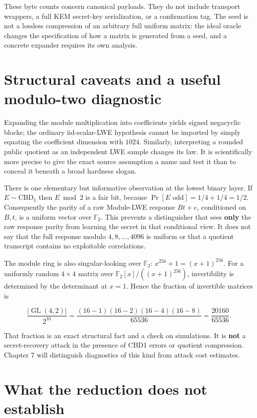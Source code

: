 \documentclass[
  11pt,
  a4paper,
  oneside]{report}
\begin{document}
These byte counts concern canonical payloads. They do not include
transport wrappers, a full KEM secret-key serialization, or a
confirmation tag. The seed is not a lossless compression of an arbitrary
full uniform matrix: the ideal oracle changes the specification of how a
matrix is generated from a seed, and a concrete expander requires its
own analysis.

\section{Structural caveats and a useful modulo-two
diagnostic}\label{structural-caveats-and-a-useful-modulo-two-diagnostic}

Expanding the module multiplication into coefficients yields signed
negacyclic blocks; the ordinary iid-scalar-LWE hypothesis cannot be
imported by simply equating the coefficient dimension with \(1024\).
Similarly, interpreting a rounded public quotient as an independent LWE
sample changes its law. It is scientifically more precise to give the
exact source assumption a name and test it than to conceal it beneath a
broad hardness slogan.

There is one elementary but informative observation at the lowest binary
layer. If \(E\sim\mathrm{CBD}_1\) then \(E\bmod2\) is a fair bit,
because \(\Pr[E\text{ odd}]=1/4+1/4=1/2\). Consequently the parity of a
raw Module-LWE response \(Bt+e\), conditioned on \(B,t\), is a uniform
vector over \(\mathbb F_2\). This prevents a distinguisher that sees
\textbf{only} the raw response parity from learning the secret in that
conditional view. It does not say that the full response modulo
\(4,8,\ldots,4096\) is uniform or that a quotient transcript contains no
exploitable correlations.

The module ring is also singular-looking over \(\mathbb F_2\):
\(x^{256}+1=(x+1)^{256}\). For a uniformly random \(4\times4\) matrix
over \(\mathbb F_2[x]/((x+1)^{256})\), invertibility is determined by
the determinant at \(x=1\). Hence the fraction of invertible matrices is

\[
\frac{|\operatorname{GL}(4,2)|}{2^{16}}
=\frac{(16-1)(16-2)(16-4)(16-8)}{65536}
=\frac{20160}{65536}.
\]

That fraction is an exact structural fact and a check on simulations. It
is \textbf{not} a secret-recovery attack in the presence of CBD1 errors
or quotient compression. Chapter 7 will distinguish diagnostics of this
kind from attack cost estimates.

\section{What the reduction does not
establish}\label{what-the-reduction-does-not-establish}
\end{document}
